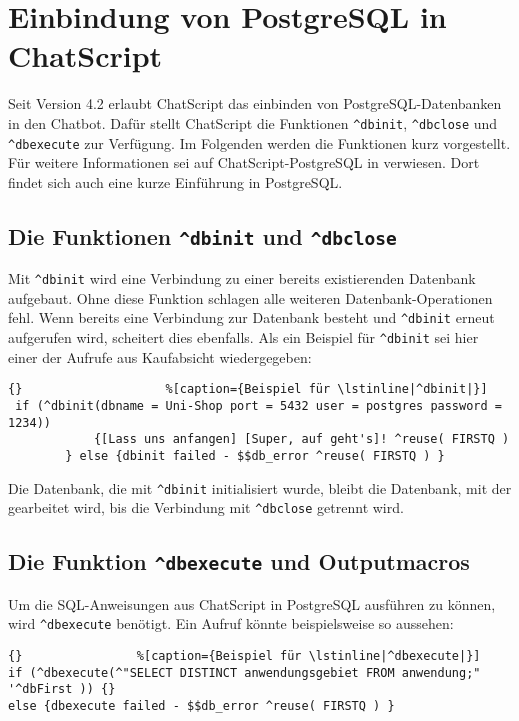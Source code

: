 \section{Einbindung von PostgreSQL in ChatScript}
\label{sec:Einbindung}
Seit Version 4.2 erlaubt ChatScript das einbinden von PostgreSQL-Datenbanken in den Chatbot. Dafür stellt ChatScript die Funktionen \lstinline|^dbinit|, \lstinline|^dbclose| und \lstinline|^dbexecute| zur Verfügung. Im Folgenden werden die Funktionen kurz vorgestellt. Für weitere Informationen sei auf ChatScript-PostgreSQL in \citet{chatscript2019} verwiesen. Dort findet sich auch eine kurze Einführung in PostgreSQL.


\subsection{Die Funktionen \lstinline|^dbinit| und \lstinline|^dbclose|}
\label{sec:dbinit}
Mit \lstinline|^dbinit| wird eine Verbindung zu einer bereits existierenden Datenbank aufgebaut. Ohne diese Funktion schlagen alle weiteren Datenbank-Operationen fehl. Wenn bereits eine Verbindung zur Datenbank besteht und \lstinline|^dbinit| erneut aufgerufen wird, scheitert dies ebenfalls. Als ein Beispiel für \lstinline|^dbinit| sei hier einer der Aufrufe aus Kaufabsicht wiedergegeben:

\begin{lstlisting}{}					%[caption={Beispiel für \lstinline|^dbinit|}]
 if (^dbinit(dbname = Uni-Shop port = 5432 user = postgres password =  1234))
	        {[Lass uns anfangen] [Super, auf geht's]! ^reuse( FIRSTQ )
	    } else {dbinit failed - $$db_error ^reuse( FIRSTQ ) }
\end{lstlisting}

Die Datenbank, die mit \lstinline|^dbinit| initialisiert wurde, bleibt die Datenbank, mit der gearbeitet wird, bis die Verbindung mit \lstinline|^dbclose| getrennt wird.\\

\subsection{Die Funktion \lstinline|^dbexecute| und Outputmacros}
\label{sec:dbexecute}

Um die SQL-Anweisungen aus ChatScript in  PostgreSQL ausführen zu können, wird \lstinline|^dbexecute| benötigt. Ein Aufruf könnte beispielsweise so aussehen:

\begin{lstlisting}{}				%[caption={Beispiel für \lstinline|^dbexecute|}]
if (^dbexecute(^"SELECT DISTINCT anwendungsgebiet FROM anwendung;" '^dbFirst )) {}
else {dbexecute failed - $$db_error ^reuse( FIRSTQ ) }
\end{lstlisting}

